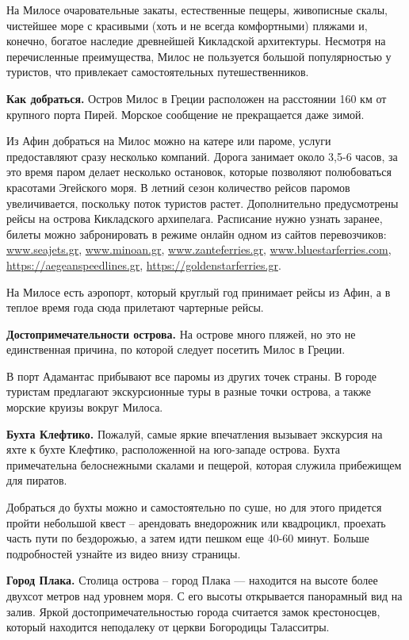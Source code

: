 На Милосе очаровательные закаты, естественные пещеры, живописные скалы, чистейшее море с красивыми (хоть и не всегда комфортными) пляжами и, конечно, богатое наследие древнейшей Кикладской архитектуры. Несмотря на перечисленные преимущества, Милос не пользуется большой популярностью у туристов, что привлекает самостоятельных путешественников.


\textbf{Как добраться.}
Остров Милос в Греции расположен на расстоянии 160 км от крупного порта Пирей. Морское сообщение не прекращается даже зимой.

Из Афин добраться на Милос можно на катере или пароме, услуги предоставляют сразу несколько компаний. Дорога занимает около 3,5-6 часов, за это время паром делает несколько остановок, которые позволяют полюбоваться красотами Эгейского моря. В летний сезон количество рейсов паромов увеличивается, поскольку поток туристов растет. Дополнительно предусмотрены рейсы на острова Кикладского архипелага. Расписание нужно узнать заранее, билеты можно забронировать в режиме онлайн одном из сайтов перевозчиков: \url{www.seajets.gr}, \url{www.minoan.gr}, \url{www.zanteferries.gr}, \url{www.bluestarferries.com}, \url{https://aegeanspeedlines.gr}, \url{https://goldenstarferries.gr}.

На Милосе есть аэропорт, который круглый год принимает рейсы из Афин, а в теплое время года сюда прилетают чартерные рейсы.

\textbf{Достопримечательности острова.}
На острове много пляжей, но это не единственная причина, по которой следует посетить Милос в Греции.

В порт Адамантас прибывают все паромы из других точек страны. В городе туристам предлагают экскурсионные туры в разные точки острова, а также морские круизы вокруг Милоса.

\textbf{Бухта Клефтико.}
Пожалуй, самые яркие впечатления вызывает экскурсия на яхте к бухте Клефтико, расположенной на юго-западе острова. Бухта примечательна белоснежными скалами и пещерой, которая служила прибежищем для пиратов.

Добраться до бухты можно и самостоятельно по суше, но для этого придется пройти небольшой квест – арендовать внедорожник или квадроцикл, проехать часть пути по бездорожью, а затем идти пешком еще 40-60 минут. Больше подробностей узнайте из видео внизу страницы.

\textbf{Город Плака.}
Столица острова – город Плака — находится на высоте более двухсот метров над уровнем моря. С его высоты открывается панорамный вид на залив. Яркой достопримечательностью города считается замок крестоносцев, который находится неподалеку от церкви Богородицы Таласситры.

